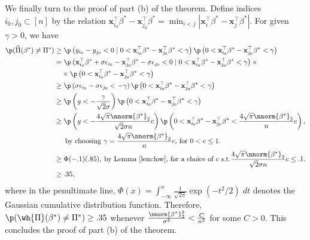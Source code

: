 \documentclass[11pt]{article}
\def\x{\mathbf{x}}
\begin{document}
\noindent We finally turn to the proof of part (b) of the theorem. Define indices $i_0, j_0 \subset [n]$ by the relation $\x_{i_0}^\top\beta^*-\x_{j_0}^\top\beta^*=\min_{i<j}|\x_i^\top\beta^*-\x_j^\top\beta^*|$. For given $\gamma>0$, we have
\begin{align*}
\p(\widehat{\Pi}(\beta^*)\ne \Pi^*) &\ge \p\left(y_{i_0}-y_{j_0} <0\mid 0<\x_{i_0}^\top\beta^*-\x_{j_0}^\top\beta^*<\gamma\right)\p\left(0<\x_{i_0}^\top\beta^*-\x_{j_0}^\top\beta^*<\gamma\right)\\
                                    &= \p\left(\x_{i_0}^\top\beta^*+\sigma\epsilon_{i_0}-\x_{j_0}^\top\beta^*-\sigma\epsilon_{j_{0}} <0\mid 0<\x_{i_0}^\top\beta^*-\x_{j_0}^\top\beta^*<\gamma\right) \times \\
  &\quad \times \p\left(0<\x_{i_0}^\top\beta^*-\x_{j_0}^\top\beta^*<\gamma\right)\\
&\ge \p\left(\sigma\epsilon_{i_0}-\sigma\epsilon_{j_{0}} <-\gamma \right)\p\left(0<\x_{i_0}^\top\beta^*-\x_{j_0}^\top\beta^*<\gamma\right)\\
&\ge \p\left(g<-\dfrac{\gamma}{\sqrt{2}\sigma} \right)\p\left(0<\x_{i_0}^\top\beta^*-\x_{j_0}^\top\beta^*<\gamma\right)\\
                                    &\ge  \p\left(g<-\dfrac{4\sqrt{\pi}\nnorm{\beta^*}_2}{\sqrt{2}\sigma n}c \right)\p\left(0<\x_{i_0}^\top\beta^*-\x_{j_0}^\top\beta^*<\dfrac{4\sqrt{\pi}\nnorm{\beta^*}_2}{n}c\right), \\
  &\quad\;\; \text{by choosing $\gamma=\dfrac{4\sqrt{\pi}\nnorm{\beta^*}_2}{n}c$, for $0<c\le 1$.}\\
&\ge \Phi(-.1)(.85), \: \text{by Lemma \ref{lem:low}, for a choice of $c$ s.t.$\dfrac{4\sqrt{\pi}\nnorm{\beta^*}_2}{\sqrt{2}\sigma n}c\le .1$.}\\
&\ge.35,
\end{align*}
where in the penultimate line, $\Phi(x) = \int_{-\infty}^x \frac{1}{\sqrt{2\pi}}\exp(-t^2/2) \; dt$ denotes the Gaussian cumulative distribution function.  
Therefore, $\p(\wh{\Pi}(\beta^*)\ne\Pi^*)\ge .35$ whenever $\frac{\nnorm{\beta^*}_2^2}{\sigma^2}<\frac{C}{n^2}$ for some $C>0$. This concludes
the proof of part (b) of the theorem. 
\end{document}
